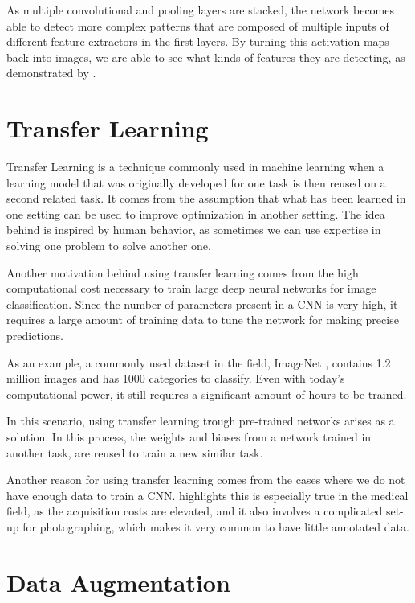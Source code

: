 
As multiple convolutional and pooling layers are stacked, the network becomes able to detect more complex patterns that are composed of multiple inputs of different feature extractors in the first layers. By turning this activation maps back into images, we are able to see what kinds of features they are detecting, as demonstrated by \citep{ZeilerF14}.

\section{Transfer Learning}

Transfer Learning is a technique commonly used in machine learning when a learning model that was originally developed for one task is then reused on a second related task. It comes from the assumption that what has been learned in one setting can be used to improve optimization in another setting. The idea behind is inspired by human behavior, as sometimes we can use expertise in solving one problem to solve another one.

Another motivation behind using transfer learning comes from the high computational cost necessary to train large deep neural networks for image classification. Since the number of parameters present in a CNN is very high, it requires a large amount of training data to tune the network for making precise predictions.

As an example, a commonly used dataset in the field, ImageNet \citep{DengDSLL009}, contains 1.2 million images and has 1000 categories to classify. Even with today's computational power, it still requires a significant amount of hours to be trained.

In this scenario, using transfer learning trough pre-trained networks arises as a solution. In this process, the weights and biases from a network trained in another task, are reused to train a new similar task.

Another reason for using transfer learning comes from the cases where we do not have enough data to train a CNN. \cite{CelonaBB19} highlights this is especially true in the medical field, as the acquisition costs are elevated, and it also involves a complicated set-up for photographing, which makes it very common to have little annotated data.

\section{Data Augmentation}

